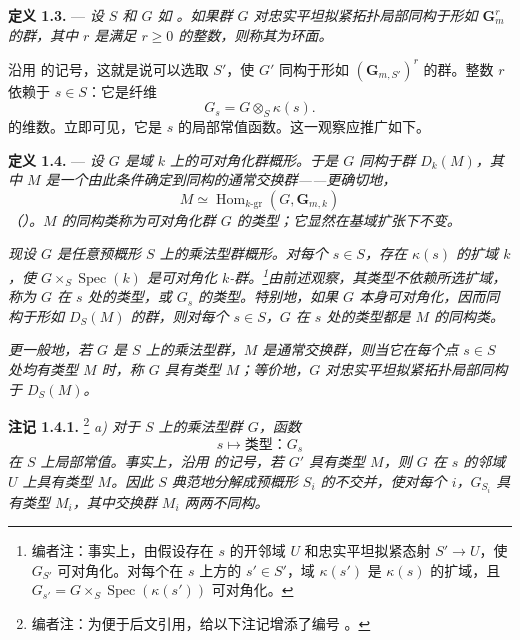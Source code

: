 \medskip
\noindent{}\textbf{定义 1.3.} ---
\textit{设 \(S\) 和 \(G\) 如 。如果群 \(G\) 对忠实平坦拟紧拓扑局部同构于形如 \(\mathbf G_m^r\) 的群，其中 \(r\) 是满足 \(r\geq 0\) 的整数，则称其为\emph{环面}。}

沿用  的记号，这就是说可以选取 \(S'\)，使 \(G'\) 同构于形如 \((\mathbf G_{m,S'})^r\) 的群。整数 \(r\) 依赖于 \(s\in S\)：它是纤维
\[
  G_s=G\otimes_S\kappa(s).
\]
的维数。立即可见，它是 \(s\) 的局部常值函数。这一观察应推广如下。

\medskip
\noindent{}\textbf{定义 1.4.} ---
\textit{设 \(G\) 是域 \(k\) 上的可对角化群概形。于是 \(G\) 同构于群 \(D_k(M)\)，其中 \(M\) 是一个由此条件确定到同构的通常交换群——更确切地，
\[
  M\simeq\operatorname{Hom}_{k\text{-}\mathrm{gr}}
    (G,\mathbf G_{m,k})
\]
（）。\(M\) 的同构类称为可对角化群 \(G\) 的\emph{类型}；它显然在基域扩张下不变。}

\textit{现设 \(G\) 是任意预概形 \(S\) 上的乘法型群概形。对每个 \(s\in S\)，存在 \(\kappa(s)\) 的扩域 \(k\)，使 \(G\times_S\operatorname{Spec}(k)\) 是可对角化 \(k\)-群。\footnote{编者注：事实上，由假设存在 \(s\) 的开邻域 \(U\) 和忠实平坦拟紧态射 \(S'\to U\)，使 \(G_{S'}\) 可对角化。对每个在 \(s\) 上方的 \(s'\in S'\)，域 \(\kappa(s')\) 是 \(\kappa(s)\) 的扩域，且 \(G_{s'}=G\times_S\operatorname{Spec}(\kappa(s'))\) 可对角化。}由前述观察，其类型不依赖所选扩域，称为 \(G\) \emph{在 \(s\) 处的类型}，或 \(G_s\) 的\emph{类型}。特别地，如果 \(G\) 本身可对角化，因而同构于形如 \(D_S(M)\) 的群，则对每个 \(s\in S\)，\(G\) 在 \(s\) 处的类型都是 \(M\) 的同构类。}

\textit{更一般地，若 \(G\) 是 \(S\) 上的乘法型群，\(M\) 是通常交换群，则当它在每个点 \(s\in S\) 处均有类型 \(M\) 时，称 \(G\) \emph{具有类型 \(M\)}；等价地，\(G\) 对忠实平坦拟紧拓扑局部同构于 \(D_S(M)\)。}

\medskip
\noindent{}\textbf{注记 1.4.1.}
\footnote{编者注：为便于后文引用，给以下注记增添了编号 。}
\textit{a) 对于 \(S\) 上的乘法型群 \(G\)，函数
\[
  s\longmapsto \text{类型：}G_s
\]
在 \(S\) 上局部常值。事实上，沿用  的记号，若 \(G'\) 具有类型 \(M\)，则 \(G\) 在 \(s\) 的邻域 \(U\) 上具有类型 \(M\)。因此 \(S\) 典范地分解成预概形 \(S_i\) 的不交并，使对每个 \(i\)，\(G_{S_i}\) 具有类型 \(M_i\)，其中交换群 \(M_i\) 两两不同构。}

